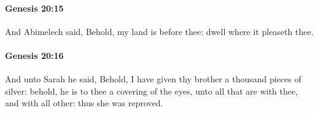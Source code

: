 		\paragraph{Genesis 20:15} %
			\label{GENESIS-20-15}

			And Abimelech said, Behold, my land is before thee: dwell where it pleaseth thee.


		\paragraph{Genesis 20:16} %
			\label{GENESIS-20-16}

			And unto Sarah he said, Behold, I have given thy brother a thousand pieces of silver: behold, he is to thee a covering of the eyes, unto all that are with thee, and with all other: thus she was reproved.


